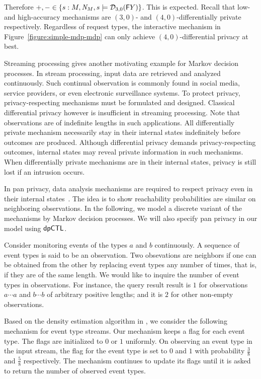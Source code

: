 Therefore $+, - \in \{ s : M, \mathit{N}_{M}, s \models \mathcal{D}_{{3}, {0}}
(\mathsf{F} Y) \}$. This is expected. Recall that low- and high-accuracy
mechanisms are $(3, 0)$- and $(4, 0)$-differentially private
respectively. Regardless of request types, the interactive mechanism
in Figure~\ref{figure:simple-mdp-mdp} can only achieve $(4,
0)$-differential privacy at best.


Streaming processing gives another motivating example for Markov
decision processes. In stream processing, input data are retrieved and
analyzed continuously. Such continual observation is commonly found
in social media, service providers, or even electronic surveillance
systems. To protect privacy, privacy-respecting mechanisms must be
formulated and designed. Classical differential privacy however is
insufficient in streaming processing. Note that observations are of
indefinite lengths in such applications. All differentially private
mechanism necessarily stay in their internal states indefinitely
before outcomes are produced. Although differential privacy demands
privacy-respecting outcomes, internal states may reveal private
information in such mechanisms. When differentially private mechanisms
are in their internal states, privacy is still lost if an intrusion
occurs.

In pan privacy, data analysis mechanisms are required to respect
privacy even in their internal states~\cite{DNPR:10:DPCO,DNPRY:10:PPSA}. 
The idea is to show reachability probabilities are similar on
neighboring observations. In the following, we model a discrete
variant of the mechanisms by Markov decision processes. We will also
specify pan privacy in our model using $\textsf{dpCTL}$.

Consider monitoring events of the types $a$ and $b$ continuously.
A sequence of event types is said to be an observation. Two
obsevations are {neighbors} if one can be obtained from the other 
by replacing event types any number of times, that is, if they are of
the same length.  
We would like to inquire the number of event types in
observations. For instance, the query result result is $1$ 
for observations $a \cdots a$ and $b \cdots b$ of arbitrary positive
lengths; and it is $2$ for other non-empty observations. 

Based on the density estimation algorithm in \cite{DNPRY:10:PPSA}, we
consider the following mechanism for event type streams. Our mechanism
keeps a flag for each event type. The flags are initialized to $0$ or
$1$ uniformly. On observing an event type in the input stream, the
flag for the event type is set to $0$ and $1$ with probability
$\frac{3}{8}$ and $\frac{5}{8}$ respectively. The mechanism continues
to update its flags until it is asked to return the number of observed
event types. 


